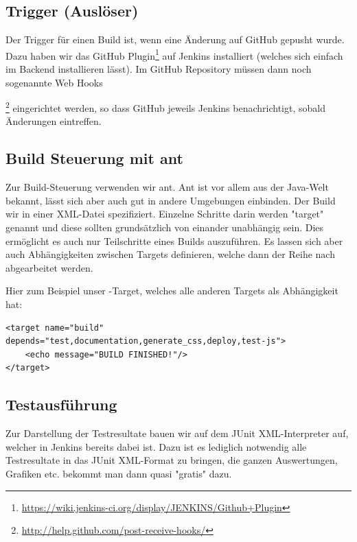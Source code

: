 \subsection{Trigger (Auslöser)}
Der Trigger für einen Build ist, wenn eine Änderung auf GitHub gepusht wurde. Dazu haben wir das GitHub Plugin\footnote{\url{https://wiki.jenkins-ci.org/display/JENKINS/Github+Plugin}} auf Jenkins installiert (welches sich einfach im Backend installieren lässt). Im GitHub Repository müssen dann noch sogenannte Web Hooks{\footnote{\url{http://help.github.com/post-receive-hooks/}} eingerichtet werden, so dass GitHub jeweils Jenkins benachrichtigt, sobald Änderungen eintreffen.

\subsection{Build Steuerung mit ant}
Zur Build-Steuerung verwenden wir ant. Ant ist vor allem aus der Java-Welt bekannt, lässt sich aber auch gut in andere Umgebungen einbinden. Der Build wir in einer XML-Datei spezifiziert. Einzelne Schritte darin werden "target" genannt und diese sollten grundsätzlich von einander unabhängig sein. Dies ermöglicht es auch nur Teilschritte eines Builds auszuführen. Es lassen sich aber auch Abhängigkeiten zwischen Targets definieren, welche dann der Reihe nach abgearbeitet werden.

Hier zum Beispiel unser -Target, welches alle anderen Targets als Abhängigkeit hat:
\lstset{language=Ant}
\begin{lstlisting}
<target name="build" depends="test,documentation,generate_css,deploy,test-js">
	<echo message="BUILD FINISHED!"/>
</target>
\end{lstlisting}

\subsection{Testausführung}
Zur Darstellung der Testresultate bauen wir auf dem JUnit XML-Interpreter auf, welcher in Jenkins bereits dabei ist. Dazu ist es lediglich notwendig alle Testresultate in das JUnit XML-Format zu bringen, die ganzen Auswertungen, Grafiken etc. bekommt man dann quasi "gratis" dazu.

}

